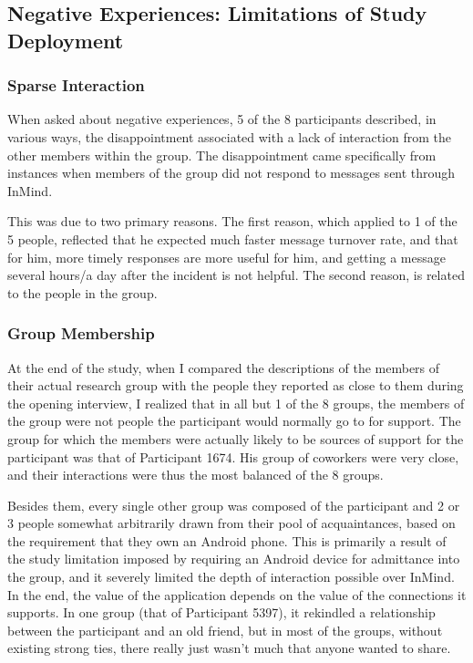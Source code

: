   \subsection{Negative Experiences: Limitations of Study Deployment}
    \subsubsection{Sparse Interaction}
      When asked about negative experiences, 5 of the 8 participants
      described, in various ways, the disappointment associated with
      a lack of interaction from the other members within the group.
      The disappointment came specifically from instances when members of the group
      did not respond to messages sent through InMind.

      This was due to two primary reasons.
      The first reason, which applied to 1 of the 5 people,
      reflected that he expected much faster message turnover rate,
      and that for him,
      more timely responses are more useful for him, and getting a message
      several hours/a day after the incident is not helpful.
      The second reason, is related to the people in the group.
    \subsubsection{Group Membership}
      At the end of the study, when I compared the descriptions of the members
      of their actual research group with the people they reported as close
      to them during the opening interview,
      I realized that in all but 1 of the 8 groups,
      the members of the group were not people the participant would normally
      go to for support.
      The group for which the members were actually likely to be sources of support
      for the participant was that of Participant 1674.
      His group of coworkers were very close, and their interactions were
      thus the most balanced of the 8 groups.

      Besides them, every single other group was composed of
      the participant and 2 or 3 people somewhat arbitrarily drawn from
      their pool of acquaintances, based on the requirement that
      they own an Android phone.
      This is primarily a result of the study limitation imposed by requiring
      an Android device for admittance into the group,
      and it severely limited the depth of interaction possible over InMind.
      In the end, the value of the application depends on the value
      of the connections it supports.
      In one group (that of Participant 5397), it rekindled a relationship
      between the participant and an old friend,
      but in most of the groups, without existing strong ties,
      there really just wasn't much that anyone wanted to share.

